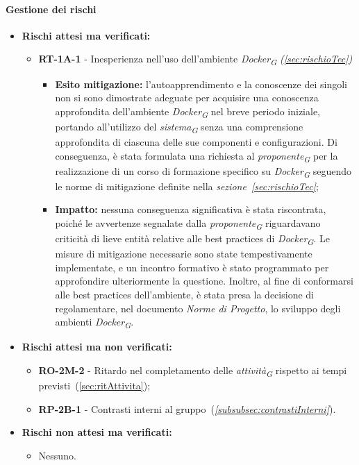 \paragraph{Gestione dei rischi} 

\begin{itemize}
    \item \textbf{Rischi attesi ma verificati:}
\begin{itemize}
    \item \textbf{RT-1A-1} - Inesperienza nell'uso dell'ambiente \textit{Docker}\textsubscript{\textit{G}} \textit{(\ref{sec:rischioTec})}
    \begin{itemize}
        \item \textbf{Esito mitigazione:} 
            l'autoapprendimento e la conoscenze dei singoli non si sono dimostrate adeguate per acquisire una conoscenza approfondita dell'ambiente \textit{Docker}\textsubscript{\textit{G}} nel breve periodo iniziale, portando all'utilizzo del \textit{sistema}\textsubscript{\textit{G}} senza una comprensione approfondita di ciascuna delle sue componenti e configurazioni. Di conseguenza, è stata formulata una richiesta al \textit{proponente}\textsubscript{\textit{G}} per la realizzazione di un corso di formazione specifico su \textit{Docker}\textsubscript{\textit{G}} seguendo le norme di mitigazione definite nella \textit{sezione~\ref{sec:rischioTec}};

        \pagebreak
        
        \item \textbf{Impatto:}
            nessuna conseguenza significativa è stata riscontrata, poiché le avvertenze segnalate dalla \textit{proponente}\textsubscript{\textit{G}} riguardavano criticità di lieve entità relative alle best practices di \textit{Docker}\textsubscript{\textit{G}}. Le misure di mitigazione necessarie sono state tempestivamente implementate, e un incontro formativo è stato programmato per approfondire ulteriormente la questione.
            Inoltre, al fine di conformarsi alle best practices dell'ambiente, è stata presa la decisione di regolamentare, nel documento \textit{Norme di Progetto}, lo sviluppo degli ambienti \textit{Docker}\textsubscript{\textit{G}}.
    \end{itemize}
\end{itemize}
\item \textbf{Rischi attesi ma non verificati:}
 \begin{itemize}
    \item \textbf{RO-2M-2} - Ritardo nel completamento delle \textit{attività}\textsubscript{\textit{G}} rispetto ai tempi previsti~(\ref{sec:ritAttivita});
    \item \textbf{RP-2B-1} - Contrasti interni al gruppo~(\textit{\ref{subsubsec:contrastiInterni}}).
\end{itemize}
\item \textbf{Rischi non attesi ma verificati:}
\begin{itemize}
    \item Nessuno.
\end{itemize}
\end{itemize}

